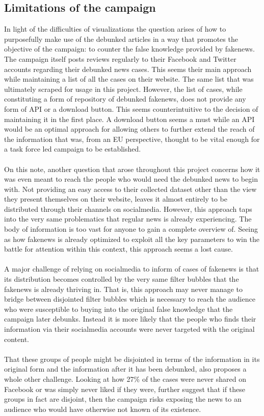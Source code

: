 \documentclass{article}
\begin{document}
\subsection{Limitations of the campaign}
In light of the difficulties of visualizations the question arises of how to purposefully make use of the debunked articles in a way that promotes the objective of the campaign: to counter the false knowledge provided by fakenews. The campaign itself posts reviews regularly to their Facebook and Twitter accounts regarding their debunked news cases. This seems their main approach while maintaining a list of all the cases on their website. The same list that was ultimately scraped for usage in this project. However, the list of cases, while constituting a form of repository of debunked fakenews, does not provide any form of API or a download button. This seems counterintuitive to the decision of maintaining it in the first place. A download button seems a must while an API would be an optimal approach for allowing others to further extend the reach of the information that was, from an EU perspective, thought to be vital enough for a task force led campaign to be established.
\\\\
On this note, another question that arose throughout this project concerns how it was even meant to reach the people who would need the debunked news to begin with. Not providing an easy access to their collected dataset other than the view they present themselves on their website, leaves it almost entirely to be distributed through their channels on socialmedia. However, this approach taps into the very same problematics that regular news is already experiencing. The body of information is too vast for anyone to gain a complete overview of. Seeing as how fakenews is already optimized to exploit all the key parameters to win the battle for attention within this context, this approach seems a lost cause.
\\\\
A major challenge of relying on socialmedia to inform of cases of fakenews is that its distribution becomes controlled by the very same filter bubbles that the fakenews is already thriving in. That is, this approach may never manage to bridge between disjointed filter bubbles which is necessary to reach the audience who were susceptible to buying into the original false knowledge that the campaign later debunks. Instead it is more likely that the people who finds their information via their socialmedia accounts were never targeted with the original content.
\\\\
That these groups of people might be disjointed in terms of the information in its original form and the information after it has been debunked, also proposes a whole other challenge. Looking at how 27\% of the cases were never shared on Facebook or was simply never liked if they were, further suggest that if these groups in fact are disjoint, then the campaign risks exposing the news to an audience who would have otherwise not known of its existence.
\end{document}
